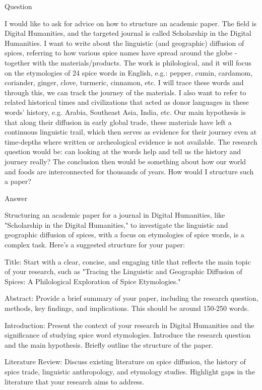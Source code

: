 \documentclass{dsh} %
\begin{document}
Question

I would like to ask for advice on how to structure an academic paper. The field is Digital Humanities, and the targeted journal is called Scholarship in the Digital Humanities. I want to write about the linguistic (and geographic) diffusion of spices, referring to how various spice names have spread around the globe - together with the materials/products. The work is philological, and it will focus on the etymologies of 24 spice words in English, e.g.: pepper, cumin, cardamom, coriander, ginger, clove, turmeric, cinnamon, etc. I will trace these words and through this, we can track the journey of the materials. I also want to refer to related historical times and civilizations that acted as donor languages in these words' history, e.g. Arabia, Southeast Asia, India, etc. Our main hypothesis is that along their diffusion in early global trade, these materials have left a continuous linguistic trail, which then serves as evidence for their journey even at time-depths where written or archeological evidence is not available. The research question would be: can looking at the words help and tell us the history and journey really? The conclusion then would be something about how our world and foods are interconnected for thousands of years. How would I structure such a paper?

Answer

Structuring an academic paper for a journal in Digital Humanities, like "Scholarship in the Digital Humanities," to investigate the linguistic and geographic diffusion of spices, with a focus on etymologies of spice words, is a complex task. Here's a suggested structure for your paper:

    Title: Start with a clear, concise, and engaging title that reflects the main topic of your research, such as "Tracing the Linguistic and Geographic Diffusion of Spices: A Philological Exploration of Spice Etymologies."

    Abstract: Provide a brief summary of your paper, including the research question, methods, key findings, and implications. This should be around 150-250 words.

    Introduction:
        Present the context of your research in Digital Humanities and the significance of studying spice word etymologies.
        Introduce the research question and the main hypothesis.
        Briefly outline the structure of the paper.

    Literature Review:
        Discuss existing literature on spice diffusion, the history of spice trade, linguistic anthropology, and etymology studies.
        Highlight gaps in the literature that your research aims to address.
\end{document}
